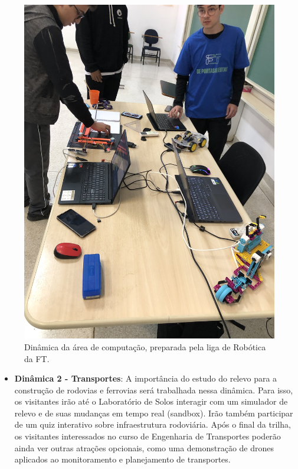 \documentclass[
  letterpaper,
  DIV=11,
  numbers=noendperiod]{scrreprt}
\providecommand{\tightlist}{%
  \setlength{\itemsep}{0pt}\setlength{\parskip}{0pt}}\usepackage{longtable,booktabs,array}
\begin{document}
\begin{figure}[H]

{\centering \includegraphics[width=0.6\linewidth,height=\textheight,keepaspectratio]{planejamento/dinamica-computacao.jpg}

}

\caption{Dinâmica da área de computação, preparada pela liga de Robótica
da FT.}

\end{figure}%

\begin{itemize}
\tightlist
\item
  \textbf{Dinâmica 2 - Transportes}: A importância do estudo do relevo
  para a construção de rodovias e ferrovias será trabalhada nessa
  dinâmica. Para isso, os visitantes irão até o Laboratório de Solos
  interagir com um simulador de relevo e de suas mudanças em tempo real
  (sandbox). Irão também participar de um quiz interativo sobre
  infraestrutura rodoviária. Após o final da trilha, os visitantes
  interessados no curso de Engenharia de Transportes poderão ainda ver
  outras atrações opcionais, como uma demonstração de drones aplicados
  ao monitoramento e planejamento de transportes.
\end{itemize}
\end{document}
